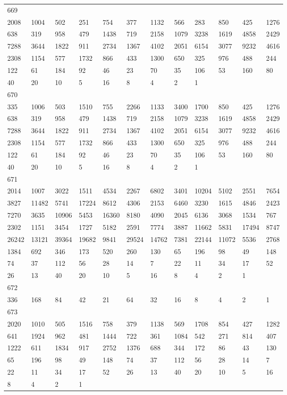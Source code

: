 \begin{longtable}{llllllllllll}
669&&&&&&&&&&&\\
2008& 1004& 502& 251& 754& 377& 1132& 566& 283& 850& 425& 1276\\
638& 319& 958& 479& 1438& 719& 2158& 1079& 3238& 1619& 4858& 2429\\
7288& 3644& 1822& 911& 2734& 1367& 4102& 2051& 6154& 3077& 9232& 4616\\
2308& 1154& 577& 1732& 866& 433& 1300& 650& 325& 976& 488& 244\\
122& 61& 184& 92& 46& 23& 70& 35& 106& 53& 160& 80\\
40& 20& 10& 5& 16& 8& 4& 2& 1& \\

670&&&&&&&&&&&\\
335& 1006& 503& 1510& 755& 2266& 1133& 3400& 1700& 850& 425& 1276\\
638& 319& 958& 479& 1438& 719& 2158& 1079& 3238& 1619& 4858& 2429\\
7288& 3644& 1822& 911& 2734& 1367& 4102& 2051& 6154& 3077& 9232& 4616\\
2308& 1154& 577& 1732& 866& 433& 1300& 650& 325& 976& 488& 244\\
122& 61& 184& 92& 46& 23& 70& 35& 106& 53& 160& 80\\
40& 20& 10& 5& 16& 8& 4& 2& 1& \\

671&&&&&&&&&&&\\
2014& 1007& 3022& 1511& 4534& 2267& 6802& 3401& 10204& 5102& 2551& 7654\\
3827& 11482& 5741& 17224& 8612& 4306& 2153& 6460& 3230& 1615& 4846& 2423\\
7270& 3635& 10906& 5453& 16360& 8180& 4090& 2045& 6136& 3068& 1534& 767\\
2302& 1151& 3454& 1727& 5182& 2591& 7774& 3887& 11662& 5831& 17494& 8747\\
26242& 13121& 39364& 19682& 9841& 29524& 14762& 7381& 22144& 11072& 5536& 2768\\
1384& 692& 346& 173& 520& 260& 130& 65& 196& 98& 49& 148\\
74& 37& 112& 56& 28& 14& 7& 22& 11& 34& 17& 52\\
26& 13& 40& 20& 10& 5& 16& 8& 4& 2& 1& \\

672&&&&&&&&&&&\\
336& 168& 84& 42& 21& 64& 32& 16& 8& 4& 2& 1\\

673&&&&&&&&&&&\\
2020& 1010& 505& 1516& 758& 379& 1138& 569& 1708& 854& 427& 1282\\
641& 1924& 962& 481& 1444& 722& 361& 1084& 542& 271& 814& 407\\
1222& 611& 1834& 917& 2752& 1376& 688& 344& 172& 86& 43& 130\\
65& 196& 98& 49& 148& 74& 37& 112& 56& 28& 14& 7\\
22& 11& 34& 17& 52& 26& 13& 40& 20& 10& 5& 16\\
8& 4& 2& 1& \\


\end{longtable}
